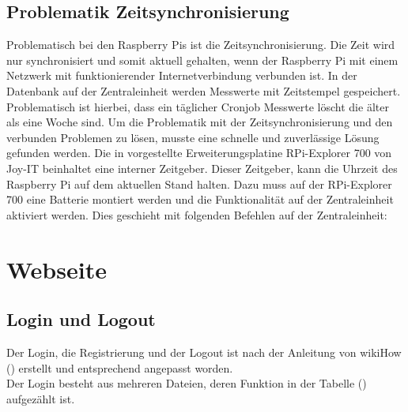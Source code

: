\subsection{Problematik Zeitsynchronisierung}
Problematisch bei den Raspberry Pis ist die Zeitsynchronisierung. Die Zeit wird nur synchronisiert und somit aktuell gehalten, wenn der Raspberry Pi mit einem Netzwerk mit funktionierender Internetverbindung verbunden ist. In der Datenbank auf der Zentraleinheit werden Messwerte mit Zeitstempel gespeichert. Problematisch ist hierbei, dass ein täglicher Cronjob Messwerte löscht die älter als eine Woche sind. Um die Problematik mit der Zeitsynchronisierung und den verbunden Problemen zu lösen, musste eine schnelle und zuverlässige Lösung gefunden werden. Die in  vorgestellte Erweiterungsplatine RPi-Explorer 700 von Joy-IT beinhaltet eine interner Zeitgeber. Dieser Zeitgeber, kann die Uhrzeit des Raspberry Pi auf dem aktuellen Stand halten. Dazu muss auf der RPi-Explorer 700 eine Batterie montiert werden und die Funktionalität auf der Zentraleinheit aktiviert werden. Dies geschieht mit folgenden Befehlen auf der Zentraleinheit:
 
\section{Webseite}
\subsection{Login und Logout}

Der Login, die Registrierung und der Logout ist nach der Anleitung von
wikiHow (\cite{PHP-Login:online}) erstellt und entsprechend angepasst worden. 
\\
Der Login besteht aus mehreren Dateien, deren Funktion in der Tabelle
() aufgezählt ist.

